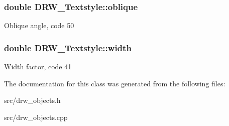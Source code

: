 \subsubsection[{oblique}]{\setlength{\rightskip}{0pt plus 5cm}double D\+R\+W\+\_\+\+Textstyle\+::oblique}\label{class_d_r_w___textstyle_a5d133a89292ecc76b6a66af88039c6cc}
Oblique angle, code 50 \hypertarget{class_d_r_w___textstyle_a36bce344a959c198199e88482ede075a}{}
\subsubsection[{width}]{\setlength{\rightskip}{0pt plus 5cm}double D\+R\+W\+\_\+\+Textstyle\+::width}\label{class_d_r_w___textstyle_a36bce344a959c198199e88482ede075a}
Width factor, code 41 

The documentation for this class was generated from the following files\+:\begin{DoxyCompactItemize}
\item 
src/drw\+\_\+objects.\+h\item 
src/drw\+\_\+objects.\+cpp\end{DoxyCompactItemize}
